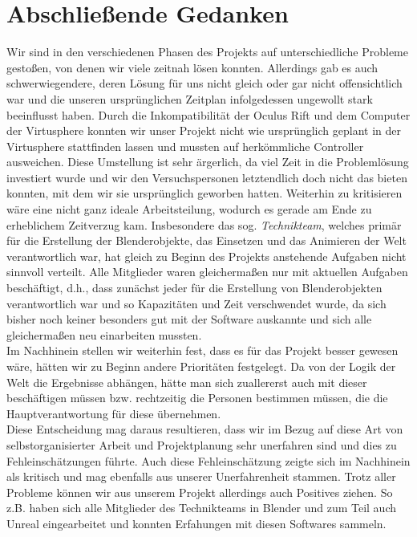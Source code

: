 \documentclass{Bericht}
\begin{document}
\section{Abschließende Gedanken} %
	Wir sind in den verschiedenen Phasen des Projekts auf unterschiedliche Probleme gestoßen, von denen wir viele zeitnah lösen konnten. Allerdings gab es auch schwerwiegendere, deren Lösung für uns nicht gleich oder gar nicht offensichtlich war und die unseren ursprünglichen Zeitplan infolgedessen ungewollt stark beeinflusst haben.
	Durch die Inkompatibilität der Oculus Rift und dem Computer der Virtusphere konnten wir unser Projekt nicht wie ursprünglich geplant in der Virtusphere stattfinden lassen und mussten auf herkömmliche Controller ausweichen. Diese Umstellung ist sehr ärgerlich, da viel Zeit in die Problemlösung investiert wurde und wir den Versuchspersonen letztendlich doch nicht das bieten konnten, mit dem wir sie ursprünglich geworben hatten. 
Weiterhin zu kritisieren wäre eine nicht ganz ideale Arbeitsteilung, wodurch es gerade am Ende zu erheblichem Zeitverzug kam. Insbesondere das sog. \textit{Technikteam}, welches primär für die Erstellung der Blenderobjekte, das Einsetzen und das Animieren der Welt verantwortlich war, hat gleich zu Beginn des Projekts anstehende Aufgaben nicht sinnvoll verteilt. Alle Mitglieder waren gleichermaßen nur mit aktuellen Aufgaben beschäftigt, d.h., dass zunächst jeder für die Erstellung von Blenderobjekten verantwortlich war und so Kapazitäten und Zeit verschwendet wurde, da sich bisher noch keiner besonders gut mit der Software auskannte und sich alle gleichermaßen neu einarbeiten mussten. \\ 
Im Nachhinein stellen wir weiterhin fest, dass es für das Projekt besser gewesen wäre, hätten wir zu Beginn andere Prioritäten festgelegt. Da von der Logik der Welt die Ergebnisse abhängen, hätte man sich zuallererst auch mit dieser beschäftigen müssen bzw. rechtzeitig die Personen bestimmen müssen, die die Hauptverantwortung für diese übernehmen.\\
Diese Entscheidung mag daraus resultieren, dass wir im Bezug auf diese Art von selbstorganisierter Arbeit und Projektplanung sehr unerfahren sind und dies zu Fehleinschätzungen führte.
Auch diese Fehleinschätzung zeigte sich im Nachhinein als kritisch und mag ebenfalls aus unserer Unerfahrenheit stammen.
	Trotz aller Probleme können wir aus unserem Projekt allerdings auch Positives ziehen. So z.B. haben sich alle Mitglieder des Technikteams in Blender und zum Teil auch Unreal eingearbeitet und konnten Erfahungen mit diesen Softwares sammeln.\\
\end{document}
